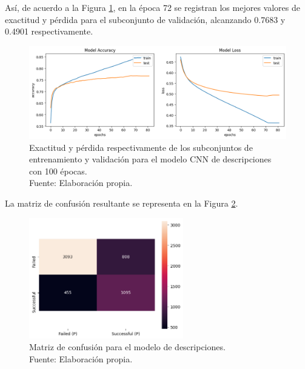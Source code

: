 Así, de acuerdo a la Figura \ref{5:fig4}, en la época 72 se registran los mejores valores de exactitud y pérdida para el subconjunto de validación, alcanzando 0.7683 y 0.4901 respectivamente.

\begin{figure}[!ht]
	\begin{center}
		\includegraphics[width=1\textwidth]{5/figures/description_model_acc_loss.png}
		\caption[Exactitud y pérdida respectivamente de los subconjuntos de entrenamiento y validación para el modelo CNN de descripciones con 100 épocas]{Exactitud y pérdida respectivamente de los subconjuntos de entrenamiento y validación para el modelo CNN de descripciones con 100 épocas.\\
		Fuente: Elaboración propia.}
		\label{5:fig4}
	\end{center}
\end{figure}

La matriz de confusión resultante se representa en la Figura \ref{5:fig5}.

\begin{figure}[!ht]
	\begin{center}
		\includegraphics[width=0.60\textwidth]{5/figures/description_confusion_matrix.png}
		\caption[Matriz de confusión para el modelo de descripciones]{Matriz de confusión para el modelo de descripciones.\\
		Fuente: Elaboración propia.}
		\label{5:fig5}
	\end{center}
\end{figure}

